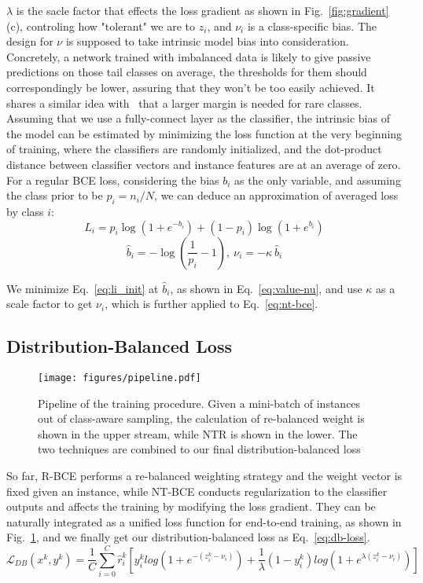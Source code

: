 \documentclass[runningheads]{llncs}
\begin{document}
$\lambda$ is the sacle factor that effects the loss gradient as shown in Fig.~\ref{fig:gradient}(c), controling how "tolerant" we are to $z_i$, and $\nu_i$ is a class-specific bias.
The design for $\nu$ is supposed to take intrinsic model bias into consideration.
Concretely, a network trained with imbalanced data is likely to give passive predictions on those tail classes on average, the thresholds for them should correspondingly be lower, assuring that they won't be too easily achieved. 
It shares a similar idea with~\cite{cao2019ldam} that a larger margin is needed for rare classes.
Assuming that we use a fully-connect layer as the classifier, the intrinsic bias of the model can be estimated by minimizing the loss function at the very beginning of training, where the classifiers are randomly initialized, and the dot-product distance between classifier vectors and instance features are at an average of zero.
For a regular BCE loss, considering the bias $b_i$ as the only variable, and assuming the class prior to be $p_i = n_i/N$, we can deduce an approximation of averaged loss by class $i$: 
\begin{equation}
L_{i} = p_i \log(1 + e^{-b_i}) + (1 - p_i) \log(1 + e^{b_i})
\label{eq:li_init}
\end{equation}
\begin{equation}
    \hat{b}_i = -\log(\frac{1}{p_i} - 1), \ \nu_i = -\kappa~\hat{b}_i
\label{eq:value-nu}
\end{equation} 

We minimize Eq.~\ref{eq:li_init} at $\hat{b}_i$, as shown in Eq.~\ref{eq:value-nu}, and use $\kappa$ as a scale factor to get $\nu_i$, which is further applied to Eq.~\ref{eq:nt-bce}. 

\subsection{Distribution-Balanced Loss}
\label{subsec:dbloss}

\begin{figure}[t]
    \centering
    \texttt{[image: figures/pipeline.pdf]}\caption{
        Pipeline of the training procedure. Given a mini-batch of instances out of class-aware sampling, 
        the calculation of re-balanced weight is shown in the upper stream, while NTR is shown in the lower. The two techniques are combined to our final distribution-balanced loss
}
    \label{fig:pipeline}
\end{figure}

So far, R-BCE performs a re-balanced weighting strategy and the weight vector is fixed given an instance, while NT-BCE conducts regularization to the classifier outputs and affects the training by modifying the loss gradient. They can be naturally integrated as a unified loss function for end-to-end training, as shown in Fig.~\ref{fig:pipeline}, and we finally get our distribution-balanced loss as Eq.~\ref{eq:db-loss}.
\begin{equation}
    \mathcal{L}_{DB}(x^k, y^k) = \frac{1}{C}\sum_{i=0}^C \hat{r}^k_i \left[ y^k_i log(1+e^{-(z^k_i-\nu_i)}) + \frac{1}{\lambda}(1 - y^k_i)log(1+e^{\lambda (z^k_i-\nu_i)}) \right]
    \label{eq:db-loss}
\end{equation}
\end{document}
